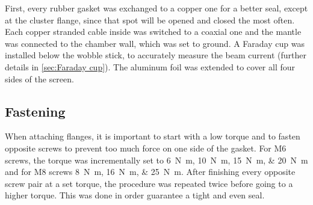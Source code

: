 First, every rubber gasket was exchanged to a copper one for a better seal, except at the cluster flange, since that spot will be opened and closed the most often. Each copper stranded cable inside was switched to a coaxial one and the mantle was connected to the chamber wall, which was set to ground. A Faraday cup was installed below the wobble stick, to accurately measure the beam current (further details in \cref{sec:Faraday cup}). The aluminum foil was extended to cover all four sides of the screen.

\subsection{Fastening}
\label{subsec:Fastening}

When attaching flanges, it is important to start with a low torque and to fasten opposite screws to prevent too much force on one side of the gasket. For M6 screws, the torque was incrementally set to \SIlist{6;10;15;20}{\newton\meter} and for M8 screws \SIlist{8;16;25}{\newton\meter}. After finishing every opposite screw pair at a set torque, the procedure was repeated twice before going to a higher torque. This was done in order guarantee a tight and even seal.